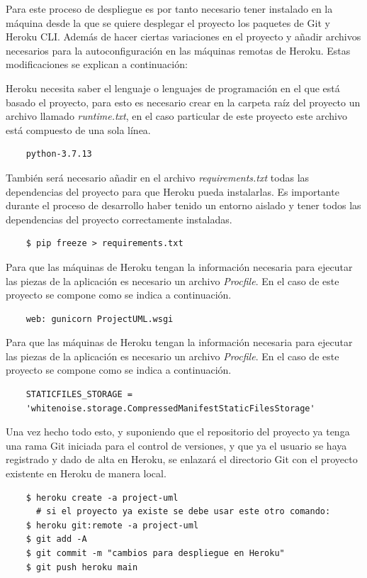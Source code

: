 \documentclass[a4paper, 12pt]{book}
\begin{document}
Para este proceso de despliegue es por tanto necesario tener instalado en la máquina desde la que se quiere desplegar el proyecto los paquetes de Git y Heroku CLI. Además de hacer ciertas variaciones en el proyecto y añadir archivos necesarios para la autoconfiguración en las máquinas remotas de Heroku. Estas modificaciones se explican a continuación: 

Heroku necesita saber el lenguaje o lenguajes de programación en el que está basado el proyecto, para esto es necesario  crear en la carpeta raíz del proyecto un archivo llamado \emph{runtime.txt}, en el caso particular de este proyecto este archivo está compuesto de una sola línea. 
\begin{verbatim}
	python-3.7.13
\end{verbatim}

También será necesario añadir en el archivo \emph{requirements.txt} todas las dependencias del proyecto para que Heroku pueda instalarlas. Es importante durante el proceso de desarrollo haber tenido un entorno aislado y tener todos las dependencias del proyecto correctamente instaladas. 
\begin{verbatim}
	$ pip freeze > requirements.txt
\end{verbatim}

Para que las máquinas de Heroku tengan la información necesaria para ejecutar las piezas de la aplicación es necesario un archivo \emph{Procfile}. En el caso de este proyecto se compone como se indica a continuación. 
\begin{verbatim}
	web: gunicorn ProjectUML.wsgi 
\end{verbatim}


Para que las máquinas de Heroku tengan la información necesaria para ejecutar las piezas de la aplicación es necesario un archivo \emph{Procfile}. En el caso de este proyecto se compone como se indica a continuación. 
\begin{verbatim}
	STATICFILES_STORAGE = 
	'whitenoise.storage.CompressedManifestStaticFilesStorage'
\end{verbatim}

Una vez hecho todo esto, y suponiendo que el repositorio del proyecto ya tenga una rama Git iniciada para el control de versiones, y que ya el usuario se haya registrado y dado de alta en Heroku, se enlazará el directorio Git con el proyecto existente en Heroku de manera local.
\begin{verbatim}
	$ heroku create -a project-uml 
	  # si el proyecto ya existe se debe usar este otro comando: 
	$ heroku git:remote -a project-uml 
	$ git add -A
	$ git commit -m "cambios para despliegue en Heroku"
	$ git push heroku main
\end{verbatim}
\end{document}

